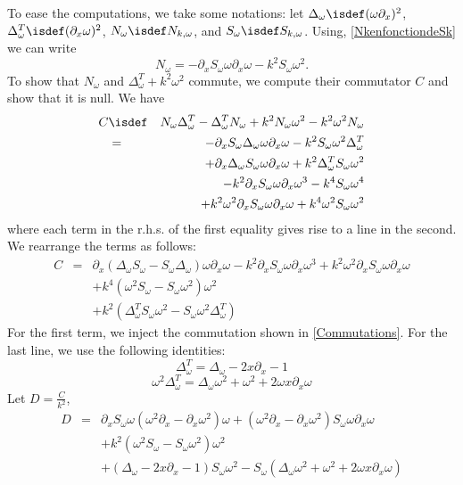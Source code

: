 \documentclass[a4paper]{article}
\begin{document}
To ease the computations, we take some notations: let $\Delta_\omega \isdef (\omega \partial_x)^2$, $\Delta_\omega^T \isdef (\partial_x \omega)^2$,  $N_\omega \isdef N_{k,\omega}$, and $S_\omega \isdef S_{k,\omega}$. Using, \autoref{NkenfonctiondeSk} we can write 
\[N_\omega = -\partial_x S_\omega \omega \partial_x \omega - k^2 S_\omega \omega^2.\]
To show that $N_\omega$ and $\Delta_\omega^T + k^2\omega^2$ commute, we compute their commutator $C$ and show that it is null. 
We have 
\begin{eqnarray*}
	C &\isdef& N_\omega \Delta_\omega^T - \Delta_\omega^T N_\omega + k^2N_\omega \omega^2 - k^2 \omega^2 N_\omega \\
	&=& -\partial_x S_\omega \Delta_\omega \omega \partial_x \omega  - k^2 S_\omega \omega^2 \Delta_\omega^T \\
	&& + \partial_x \Delta_\omega S_\omega \omega \partial_x \omega + k^2 \Delta_\omega^T S_\omega \omega^2 \\
	&& - k^2 \partial_x S_\omega \omega \partial_x \omega^3 - k^4 S_\omega \omega^4 \\
	&& + k^2 \omega^2 \partial_x S_\omega \omega \partial_x \omega + k^4 \omega^2 S_\omega \omega^2
\end{eqnarray*}
where each term in the r.h.s. of the first equality gives rise to a line in the second. We rearrange the terms as follows:
\begin{eqnarray*}
	C &=& \partial_x (\Delta_\omega S_\omega - S_\omega \Delta_\omega) \omega \partial_x \omega - k^2 \partial_x S_\omega \omega \partial_x \omega^3 + k^2 \omega^2 \partial_x S_\omega \omega\partial_x \omega\\	
	&& + k^4 (\omega^2 S_\omega - S_\omega \omega^2) \omega^2\\
	&& + k^2(\Delta_\omega^T S_\omega \omega^2 - S_\omega \omega^2 \Delta_\omega^T)
\end{eqnarray*}
For the first term, we inject the commutation shown in \autoref{Commutations}. For the last line, we use the following identities: 
\[ \Delta_\omega^T = \Delta_\omega - 2x \partial_x - 1\]
\[ \omega^2 \Delta_\omega^T = \Delta_\omega \omega^2 + \omega^2 + 2 \omega x \partial_x \omega\]
Let $D = \frac{C}{k^2}$, 
\begin{eqnarray*}
	D &=& \partial_x S_\omega \omega (\omega^2\partial_x - \partial_x \omega^2) \omega  + (\omega^2 \partial_x - \partial_x \omega^2)S_\omega \omega \partial_x \omega\\
	&&+ k^2(\omega^2 S_\omega - S_\omega \omega^2) \omega^2\\
	&&+ (\Delta_\omega - 2x \partial_x - 1)S_\omega \omega^2 - S_\omega(\Delta_\omega \omega^2 + \omega^2 + 2\omega x \partial_x \omega) 
\end{eqnarray*}
\end{document}
